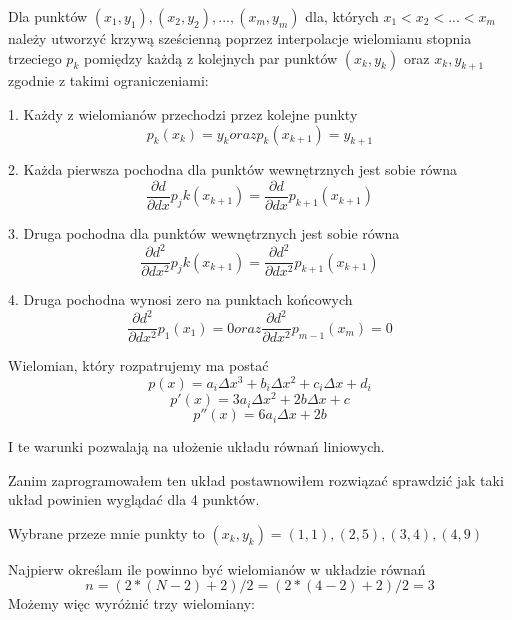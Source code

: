 \documentclass[varwidth,12pt,a4paper]{article}
\begin{document}
Dla punktów $(x_1, y_1), (x_2, y_2), ..., (x_m, y_m)$ dla, których $x_1 < x_2 < ... < x_m $
należy utworzyć krzywą sześcienną poprzez interpolacje wielomianu stopnia trzeciego $p_k$ 
pomiędzy każdą z kolejnych par punktów $(x_k, y_k)$ oraz $x_{k}, y_{k+1}$ zgodnie z takimi ograniczeniami:

1. Każdy z wielomianów przechodzi przez kolejne punkty
\begin{equation}
    p_k (x_k) = y_k oraz p_k (x_{k+1}) = y_{k + 1}
\end{equation}

2. Każda pierwsza pochodna dla punktów wewnętrznych jest sobie równa
\begin{equation}
     \frac{\partial d}{\partial dx} p_jk (x_{k+1}) = \frac{\partial d}{\partial dx} p_{k+1} (x_{k+1})
\end{equation}

3. Druga pochodna dla punktów wewnętrznych jest sobie równa
\begin{equation}
     \frac{\partial d^2}{\partial dx^2} p_jk (x_{k+1}) = \frac{\partial d^2}{\partial dx^2} p_{k+1} (x_{k+1})
\end{equation}

4. Druga pochodna wynosi zero na punktach końcowych
\begin{equation}
     \frac{\partial d^2}{\partial dx^2} p_1 (x_{1}) = 0 oraz \frac{\partial d^2}{\partial dx^2} p_{m-1} (x_{m}) = 0
\end{equation}

Wielomian, który rozpatrujemy ma postać
\begin{equation}
    p(x) = a_i \Delta x^3 + b_i \Delta x^2 + c_i \Delta x + d_i
\end{equation}
\begin{equation}
    p'(x) = 3 a_i \Delta x^2 + 2b \Delta x + c
\end{equation}
\begin{equation}
    p''(x) = 6 a_i \Delta x + 2b
\end{equation}

I te warunki pozwalają na ułożenie układu równań liniowych.

Zanim zaprogramowałem ten układ postawnowiłem rozwiązać sprawdzić jak taki układ powinien wyglądać dla 4 punktów.

Wybrane przeze mnie punkty to $(x_k, y_k)  = (1,1), (2,5), (3,4), (4, 9) $

Najpierw określam ile powinno być wielomianów w układzie równań 
\begin{equation}
n=(2*(N-2)+2)/2 = (2*(4-2)+2)/2 = 3 
\end{equation}
Możemy więc wyróżnić trzy wielomiany:
\end{document}
